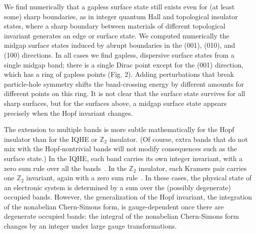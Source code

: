 \documentclass[prl,showpacs,superscriptaddress,twocolumn,preprintnumbers,amssymb,amsfonts]{revtex4}
\begin{document}
We find numerically that a gapless surface state still exists even for (at least some) sharp boundaries, as in integer quantum Hall and topological insulator states, where a sharp boundary between materials of different topological invariant generates an edge or surface state.  We computed numerically the midgap surface states induced by abrupt boundaries in the (001), (010), and (100) directions.  In all cases we find gapless, dispersive surface states from a single midgap band; there is a single Dirac point except for the (001) direction, which has a ring of gapless points (Fig. 2).  Adding perturbations that break particle-hole symmetry shifts the band-crossing energy by different amounts for different points on this ring.  It is not clear that the surface state survives for all sharp surfaces, but for the surfaces above, a midgap surface state appears precisely when the Hopf invariant changes.


The extension to multiple bands is more subtle mathematically for the Hopf insulator than for the IQHE or $\mathbb{Z}_2$ insulator.   (Of course, extra bands that do not mix with the Hopf-nontrivial bands will not modify consequences such as the surface state.)  In the IQHE, each band carries its own integer invariant, with a zero sum rule over all the bands~\cite{ass}.  In the $\mathbb{Z}_2$ insulator, each Kramers pair carries one $\mathbb{Z}_2$ invariant, again with a zero sum rule~\cite{moore&balents-2006}.  In these cases, the physical state of an electronic system is determined by a sum over the (possibly degenerate) occupied bands.  However, the generalization of the Hopf invariant, the integration of the nonabelian Chern-Simons form, is gauge-dependent once there are degenerate occupied bands: the integral of the nonabelian Chern-Simons form changes by an integer under large gauge transformations.
\end{document}
